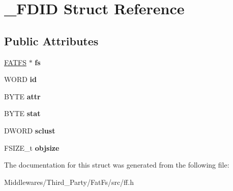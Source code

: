 \hypertarget{struct___f_d_i_d}{}\section{\+\_\+\+F\+D\+ID Struct Reference}
\label{struct___f_d_i_d}
\subsection*{Public Attributes}
\begin{DoxyCompactItemize}
\item 
\mbox{\label{struct___f_d_i_d_aefa4597d88e54bace32e6c15e11d9610}} 
\mbox{\hyperlink{struct_f_a_t_f_s}{F\+A\+T\+FS}} $\ast$ {\bfseries fs}
\item 
\mbox{\label{struct___f_d_i_d_a363d7bdab408418b911ac1502bc22ea6}} 
W\+O\+RD {\bfseries id}
\item 
\mbox{\label{struct___f_d_i_d_a6912cfc1ea914d7b68a18b846065d790}} 
B\+Y\+TE {\bfseries attr}
\item 
\mbox{\label{struct___f_d_i_d_a1a2ff09f2ef172772f4e7312070be708}} 
B\+Y\+TE {\bfseries stat}
\item 
\mbox{\label{struct___f_d_i_d_ae2fbaaa31b5d12b333cb6d1ded099412}} 
D\+W\+O\+RD {\bfseries sclust}
\item 
\mbox{\label{struct___f_d_i_d_a27039b8d89a4a62efabab36e6b303819}} 
F\+S\+I\+Z\+E\+\_\+t {\bfseries objsize}
\end{DoxyCompactItemize}


The documentation for this struct was generated from the following file\+:\begin{DoxyCompactItemize}
\item 
Middlewares/\+Third\+\_\+\+Party/\+Fat\+Fs/src/ff.\+h\end{DoxyCompactItemize}
